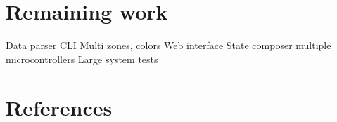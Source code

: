 \documentclass[onecolumn, draftclsnofoot,10pt, compsoc]{IEEEtran}
\begin{document}
	\section{Remaining work}
	Data parser
	CLI Multi zones, colors
	Web interface
	State composer multiple microcontrollers
	Large system tests


	\section{References}
			\begingroup
				\renewcommand{\addcontentsline}[3]{}%
				\renewcommand{\section}[2]{}%
				
				
			\endgroup
\end{document}
